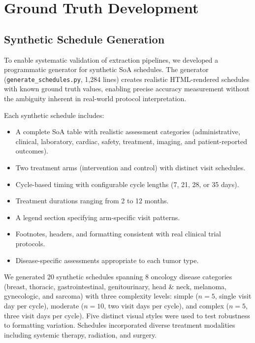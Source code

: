 \documentclass[11pt]{article}
\begin{document}
\section{Ground Truth Development}

\subsection{Synthetic Schedule Generation}

To enable systematic validation of extraction pipelines, we developed a programmatic generator for synthetic SoA schedules. The generator (\texttt{generate\_schedules.py}, 1,284 lines) creates realistic HTML-rendered schedules with known ground truth values, enabling precise accuracy measurement without the ambiguity inherent in real-world protocol interpretation.

Each synthetic schedule includes:
\begin{itemize}[leftmargin=*]
    \item A complete SoA table with realistic assessment categories (administrative, clinical, laboratory, cardiac, safety, treatment, imaging, and patient-reported outcomes).
    \item Two treatment arms (intervention and control) with distinct visit schedules.
    \item Cycle-based timing with configurable cycle lengths (7, 21, 28, or 35 days).
    \item Treatment durations ranging from 2 to 12 months.
    \item A legend section specifying arm-specific visit patterns.
    \item Footnotes, headers, and formatting consistent with real clinical trial protocols.
    \item Disease-specific assessments appropriate to each tumor type.
\end{itemize}

We generated 20 synthetic schedules spanning 8 oncology disease categories (breast, thoracic, gastrointestinal, genitourinary, head \& neck, melanoma, gynecologic, and sarcoma) with three complexity levels: simple ($n=5$, single visit day per cycle), moderate ($n=10$, two visit days per cycle), and complex ($n=5$, three visit days per cycle). Five distinct visual styles were used to test robustness to formatting variation. Schedules incorporated diverse treatment modalities including systemic therapy, radiation, and surgery.
\end{document}
